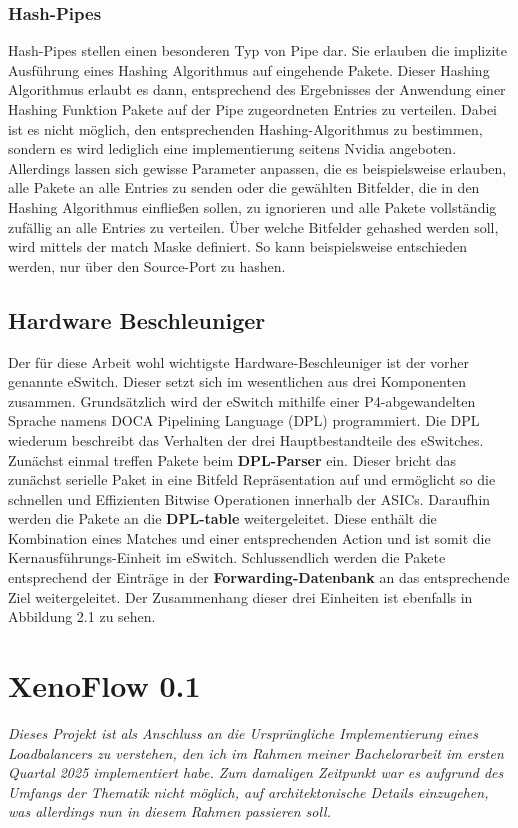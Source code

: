 \documentclass[paper=a4, fontsize=11pt]{scrartcl} %
\numberwithin{equation}{section} %
\numberwithin{figure}{section} %
\numberwithin{table}{section} %
\begin{document}
\subsubsection{Hash-Pipes}
Hash-Pipes stellen einen besonderen Typ von Pipe dar. Sie erlauben die implizite Ausführung eines Hashing Algorithmus auf eingehende Pakete. Dieser Hashing Algorithmus erlaubt es dann, entsprechend des Ergebnisses der Anwendung einer Hashing Funktion Pakete auf der Pipe zugeordneten Entries zu verteilen. Dabei ist es nicht möglich, den entsprechenden Hashing-Algorithmus zu bestimmen, sondern es wird lediglich eine implementierung seitens Nvidia angeboten. Allerdings lassen sich gewisse Parameter anpassen, die es beispielsweise erlauben, alle Pakete an alle Entries zu senden oder die gewählten Bitfelder, die in den Hashing Algorithmus einfließen sollen, zu ignorieren und alle Pakete vollständig zufällig an alle Entries zu verteilen. Über welche Bitfelder gehashed werden soll, wird mittels der match Maske definiert. So kann beispielsweise entschieden werden, nur über den Source-Port zu hashen. 
\subsection{Hardware Beschleuniger}
Der für diese Arbeit wohl wichtigste Hardware-Beschleuniger ist der vorher genannte eSwitch. Dieser setzt sich im wesentlichen aus drei Komponenten zusammen. Grundsätzlich wird der eSwitch mithilfe einer P4-abgewandelten Sprache namens DOCA Pipelining Language (DPL) programmiert. Die DPL wiederum beschreibt das Verhalten der drei Hauptbestandteile des eSwitches. Zunächst einmal treffen Pakete beim \textbf{DPL-Parser} ein. Dieser bricht das zunächst serielle Paket in eine Bitfeld Repräsentation auf und ermöglicht so die schnellen und Effizienten Bitwise Operationen innerhalb der ASICs. Daraufhin werden die Pakete an die \textbf{DPL-table} weitergeleitet. Diese enthält die Kombination eines Matches und einer entsprechenden Action und ist somit die Kernausführungs-Einheit im eSwitch. Schlussendlich werden die Pakete entsprechend der Einträge in der \textbf{Forwarding-Datenbank} an das entsprechende Ziel weitergeleitet. Der Zusammenhang dieser drei Einheiten ist ebenfalls in Abbildung 2.1 zu sehen. \newpage
\section{XenoFlow 0.1}
\textit{Dieses Projekt ist als Anschluss an die Ursprüngliche Implementierung eines Loadbalancers zu verstehen, den ich im Rahmen meiner Bachelorarbeit im ersten Quartal 2025 implementiert habe. Zum damaligen Zeitpunkt war es aufgrund des Umfangs der Thematik nicht möglich, auf architektonische Details einzugehen, was allerdings nun in diesem Rahmen passieren soll.}
\end{document}
